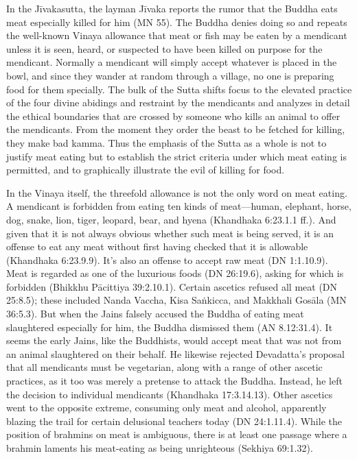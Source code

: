 \documentclass[12pt,openany]{book}%
\begin{document}
In the \textsanskrit{Jīvakasutta}, the layman \textsanskrit{Jīvaka} reports the rumor that the Buddha eats meat especially killed for him (MN 55). The Buddha denies doing so and repeats the well-known Vinaya allowance that meat or fish may be eaten by a mendicant unless it is seen, heard, or suspected to have been killed on purpose for the mendicant. Normally a mendicant will simply accept whatever is placed in the bowl, and since they wander at random through a village, no one is preparing food for them specially. The bulk of the Sutta shifts focus to the elevated practice of the four divine abidings and restraint by the mendicants and analyzes in detail the ethical boundaries that are crossed by someone who kills an animal to offer the mendicants. From the moment they order the beast to be fetched for killing, they make bad kamma. Thus the emphasis of the Sutta as a whole is not to justify meat eating but to establish the strict criteria under which meat eating is permitted, and to graphically illustrate the evil of killing for food.

In the Vinaya itself, the threefold allowance is not the only word on meat eating. A mendicant is forbidden from eating ten kinds of meat—human, elephant, horse, dog, snake, lion, tiger, leopard, bear, and hyena (Khandhaka 6:23.1.1 ff.). And given that it is not always obvious whether such meat is being served, it is an offense to eat any meat without first having checked that it is allowable (Khandhaka 6:23.9.9). It’s also an offense to accept raw meat (DN 1:1.10.9). Meat is regarded as one of the luxurious foods (DN 26:19.6), asking for which is forbidden (Bhikkhu \textsanskrit{Pācittiya} 39:2.10.1). Certain ascetics refused all meat (DN 25:8.5); these included Nanda Vaccha, Kisa \textsanskrit{Saṅkicca}, and Makkhali \textsanskrit{Gosāla} (MN 36:5.3). But when the Jains falsely accused the Buddha of eating meat slaughtered especially for him, the Buddha dismissed them (AN 8.12:31.4). It seems the early Jains, like the Buddhists, would accept meat that was not from an animal slaughtered on their behalf. He likewise rejected Devadatta’s proposal that all mendicants must be vegetarian, along with a range of other ascetic practices, as it too was merely a pretense to attack the Buddha. Instead, he left the decision to individual mendicants (Khandhaka 17:3.14.13). Other ascetics went to the opposite extreme, consuming only meat and alcohol, apparently blazing the trail for certain delusional teachers today (DN 24:1.11.4). While the position of brahmins on meat is ambiguous, there is at least one passage where a brahmin laments his meat-eating as being unrighteous (Sekhiya 69:1.32).
\end{document}
